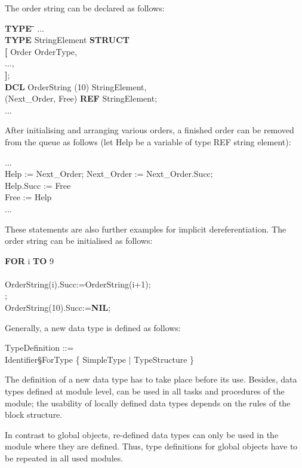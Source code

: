 \begin{enumerate}
The order string can be declared as follows:

\begin{tabbing}
{\bf TYPE} \= \x \= \x \= \kill
... \> \> \> \\
{\bf TYPE} \> StringElement {\bf STRUCT} \> \> \\
           \>   \> {\bf [} \> Order  OrderType,\\
           \>   \>         \> ...,\\
           \>   \> {\bf ]};\\
{\bf DCL}  \> OrderString (10) StringElement, \> \> \\
           \> (Next\_Order, Free) {\bf REF} StringElement;\\
... \> \> \>
\end{tabbing}

After initialising and arranging various orders, a finished order can be
removed from the queue as follows (let Help be a variable of type REF
string element):

...\\
Help := Next\_Order;
Next\_Order := Next\_Order.Succ;\\
Help.Succ := Free\\
Free := Help\\
...

These statements are also further examples for implicit
dereferentiation. The order string can be initialised as follows:

{\bf FOR} i {\bf TO} 9\\
 \\
\x \x OrderString(i).Succ:=OrderString(i+1);\\
;\\
OrderString(10).Succ:={\bf NIL};
\end{enumerate}

Generally, a new data type is defined as follows:

TypeDefinition ::=\\
 Identifier\S ForType \{ SimpleType $\mid$ TypeStructure \}

The definition of a new data type has to take place before its use.
Besides, data types defined at module level, can be used in all tasks
and procedures of the module; the usability of locally defined data
types depends on the rules of the block structure.

In contrast to global objects, re-defined data types can only be used
in the module where they are defined. Thus, type definitions for
global objects have to be repeated in all used modules.

